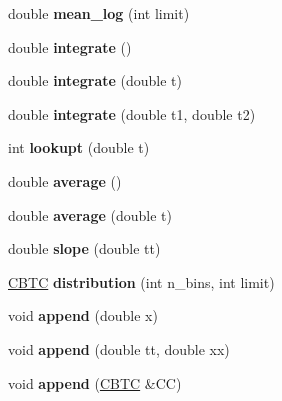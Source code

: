 \begin{DoxyCompactItemize}
double {\bfseries mean\+\_\+log} (int limit)
\item 
\mbox{\label{class_c_b_t_c_aa923ad44a75b94f3954076ed7ebd0670}} 
double {\bfseries integrate} ()
\item 
\mbox{\label{class_c_b_t_c_afc532dc3243c8f8ef3cdf32ba3161ecd}} 
double {\bfseries integrate} (double t)
\item 
\mbox{\label{class_c_b_t_c_a7ea39a5a79128fc1ef001ea3d3f8daa1}} 
double {\bfseries integrate} (double t1, double t2)
\item 
\mbox{\label{class_c_b_t_c_a8d3fa62ff2ce533a4c01e9930a2c140b}} 
int {\bfseries lookupt} (double t)
\item 
\mbox{\label{class_c_b_t_c_a8824e58da2893714640658a0389677f1}} 
double {\bfseries average} ()
\item 
\mbox{\label{class_c_b_t_c_aa7d88e6d6ecfb575710c3a71cbdcd5d4}} 
double {\bfseries average} (double t)
\item 
\mbox{\label{class_c_b_t_c_a8a294b60b228085ac593a275c708dd34}} 
double {\bfseries slope} (double tt)
\item 
\mbox{\label{class_c_b_t_c_a863a2f3aeaa429e52a5ed71cb8725f4c}} 
\hyperlink{class_c_b_t_c}{C\+B\+TC} {\bfseries distribution} (int n\+\_\+bins, int limit)
\item 
\mbox{\label{class_c_b_t_c_a11e33f352db992c9882018cc96409c39}} 
void {\bfseries append} (double x)
\item 
\mbox{\label{class_c_b_t_c_a2201e5316addb42dcd3a2d29ff01db6a}} 
void {\bfseries append} (double tt, double xx)
\item 
\mbox{\label{class_c_b_t_c_ad41919eaf6202599da5175ce8db45459}} 
void {\bfseries append} (\hyperlink{class_c_b_t_c}{C\+B\+TC} \&CC)
\item 
\mbox{\label{class_c_b_t_c_a8b3817ba82bc85804b37765d56519269}} 

\end{DoxyCompactItemize}
